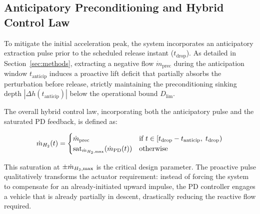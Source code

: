\subsection*{Anticipatory Preconditioning and Hybrid Control Law}

To mitigate the initial acceleration peak, the system incorporates an anticipatory extraction pulse prior to the scheduled release instant ($t_\text{drop}$). As detailed in Section~\ref{sec:methods}, extracting a negative flow $\dot{m}_\text{prec}$ during the anticipation window $t_\text{anticip}$ induces a proactive lift deficit that partially absorbs the perturbation before release, strictly maintaining the preconditioning sinking depth $|\Delta h(t_\text{anticip})|$ below the operational bound $D_\text{lim}$.

The overall hybrid control law, incorporating both the anticipatory pulse and the saturated PD feedback, is defined as:

\begin{equation}
\dot{m}_{H_2}(t) =
\begin{cases}
\dot{m}_\text{prec} & \text{if } t \in [t_\text{drop}-t_\text{anticip},\; t_\text{drop}) \\
\text{sat}_{\dot{m}_{H_2,\text{max}}}\!\left(\dot{m}_\text{PD}(t)\right) & \text{otherwise}
\end{cases}
\label{eq:hybrid_app}
\end{equation}

This saturation at $\pm\dot{m}_{H_2,\text{max}}$ is the critical design parameter. The proactive pulse qualitatively transforms the actuator requirement: instead of forcing the system to compensate for an already-initiated upward impulse, the PD controller engages a vehicle that is already partially in descent, drastically reducing the reactive flow required.